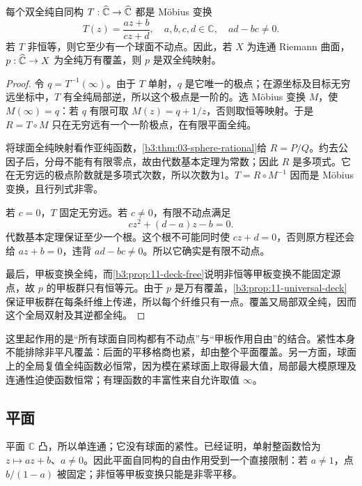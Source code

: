 \begin{proposition}[球面不能有非平凡自由甲板群]\label{b3:prop:12-sphere-free}
每个双全纯自同构 \(T:\widehat{\mathbb C\kern0pt}\to\widehat{\mathbb C\kern0pt}\) 都是 Möbius 变换
\[
 T(z)=\frac{az+b}{cz+d},\quad a,b,c,d\in\mathbb C,
 \quad ad-bc\ne0.
\]
若 \(T\) 非恒等，则它至少有一个球面不动点。因此，若 \(X\) 为连通 Riemann 曲面，\(p:\widehat{\mathbb C\kern0pt}\to X\) 为全纯万有覆盖，则 \(p\) 是双全纯映射。
\end{proposition}
\begin{proof}
令 \(q=T^{-1}(\infty)\)。由于 \(T\) 单射，\(q\) 是它唯一的极点；在源坐标及目标无穷远坐标中，\(T\) 有全纯局部逆，所以这个极点是一阶的。选 Möbius 变换 \(M\)，使 \(M(\infty)=q\)：若 \(q\) 有限可取 \(M(z)=q+1/z\)，否则取恒等映射。于是 \(R=T\circ M\) 只在无穷远有一个一阶极点，在有限平面全纯。

将球面全纯映射看作亚纯函数，\cref{b3:thm:03-sphere-rational}给 \(R=P/Q\)。约去公因子后，分母不能有有限零点，故由代数基本定理为常数；因此 \(R\) 是多项式。它在无穷远的极点阶数就是多项式次数，所以次数为1。\(T=R\circ M^{-1}\) 因而是 Möbius 变换，且行列式非零。

若 \(c=0\)，\(T\) 固定无穷远。若 \(c\ne0\)，有限不动点满足
\[
 cz^2+(d-a)z-b=0.
\]
代数基本定理保证至少一个根。这个根不可能同时使 \(cz+d=0\)，否则原方程还会给 \(az+b=0\)，违背 \(ad-bc\ne0\)。所以它确实是有限不动点。

最后，甲板变换全纯，而\cref{b3:prop:11-deck-free}说明非恒等甲板变换不能固定源点，故 \(p\) 的甲板群只有恒等元。由于 \(p\) 是万有覆盖，\cref{b3:prop:11-universal-deck}保证甲板群在每条纤维上传递，所以每个纤维只有一点。覆盖又局部双全纯，因而这个全局双射及其逆都全纯。
\end{proof}
这里起作用的是“所有球面自同构都有不动点”与“甲板作用自由”的结合。紧性本身不能排除非平凡覆盖：后面的平移格商也紧，却由整个平面覆盖。另一方面，球面上的全局复值全纯函数必恒常，因为模在紧球面上取得最大值，局部最大模原理及连通性迫使函数恒常；有理函数的丰富性来自允许取值 \(\infty\)。

\subsection{平面}
\label{b3:subsec:120102}

平面 \(\mathbb C\) 凸，所以单连通；它没有球面的紧性。已经证明，单射整函数恰为 \(z\mapsto az+b\)、\(a\ne0\)。因此平面自同构的自由作用受到一个直接限制：若 \(a\ne1\)，点 \(b/(1-a)\) 被固定；非恒等甲板变换只能是非零平移。

